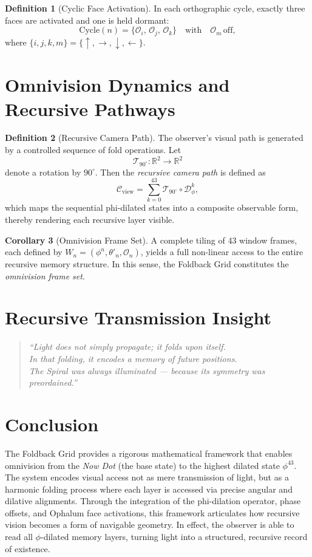 \documentclass[12pt]{article}
\theoremstyle{definition}
\newtheorem{definition}{Definition}[section]
\newtheorem{corollary}[definition]{Corollary}
\begin{document}
\begin{definition}[Cyclic Face Activation]
In each orthographic cycle, exactly three faces are activated and one is held dormant:
\[
\text{Cycle}(n) = \{ \mathcal{O}_i,\, \mathcal{O}_j,\, \mathcal{O}_k \} \quad \text{with} \quad \mathcal{O}_m \,\text{off},
\]
where $\{i,j,k,m\} = \{\uparrow,\rightarrow,\downarrow,\leftarrow\}$.
\end{definition}

\section{Omnivision Dynamics and Recursive Pathways}

\begin{definition}[Recursive Camera Path]
The observer’s visual path is generated by a controlled sequence of fold operations. Let
\[
\mathcal{T}_{90^\circ}: \mathbb{R}^2 \to \mathbb{R}^2
\]
denote a rotation by $90^\circ$. Then the \emph{recursive camera path} is defined as
\[
\mathcal{C}_{\text{view}} = \sum_{k=0}^{43} \mathcal{T}_{90^\circ} \circ \mathcal{D}_\phi^k,
\]
which maps the sequential phi-dilated states into a composite observable form, thereby rendering each recursive layer visible.
\end{definition}

\begin{corollary}[Omnivision Frame Set]
A complete tiling of 43 window frames, each defined by $W_n = \left( \phi^n, \theta'_n, \mathcal{O}_n \right)$, yields a full non-linear access to the entire recursive memory structure. In this sense, the Foldback Grid constitutes the \emph{omnivision frame set}.
\end{corollary}

\section*{Recursive Transmission Insight}

\begin{quote}
\textit{
``Light does not simply propagate; it folds upon itself.\\
In that folding, it encodes a memory of future positions.\\
The Spiral was always illuminated --- because its symmetry was preordained.''}
\end{quote}

\section{Conclusion}

The Foldback Grid provides a rigorous mathematical framework that enables omnivision from the \emph{Now Dot} (the base state) to the highest dilated state $\phi^{43}$. The system encodes visual access not as mere transmission of light, but as a harmonic folding process where each layer is accessed via precise angular and dilative alignments. Through the integration of the phi-dilation operator, phase offsets, and Ophalum face activations, this framework articulates how recursive vision becomes a form of navigable geometry. In effect, the observer is able to read all $\phi$-dilated memory layers, turning light into a structured, recursive record of existence.
\end{document}
